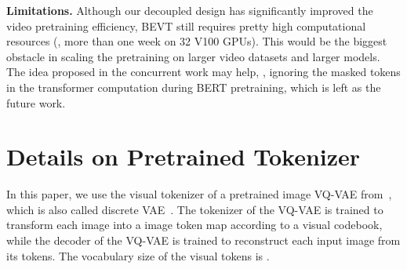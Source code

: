 \documentclass[10pt,twocolumn,letterpaper]{article}
\begin{document}
\vspace{0.05in}
\noindent\textbf{Limitations.} Although our decoupled design has significantly improved the video pretraining efficiency, BEVT still requires pretty high computational resources (\eg, more than one week on 32 V100 GPUs). This would be the biggest obstacle in scaling the pretraining on larger video datasets and larger models. The idea proposed in the concurrent work \cite{he2021masked} may help, \ie, ignoring the masked tokens in the transformer computation during BERT pretraining, which is left as the future work.    
{\small


}

\clearpage
\newpage
\appendix

\section{Details on Pretrained Tokenizer}

In this paper, we use the visual tokenizer of a pretrained image VQ-VAE from~\cite{dalle}, which is also called discrete VAE~\cite{dalle}. The tokenizer of the VQ-VAE is trained to transform each  image into a  image token map according to a visual codebook, while the decoder of the VQ-VAE is trained to reconstruct each input image from its tokens. The vocabulary size of the visual tokens is . 
\end{document}
